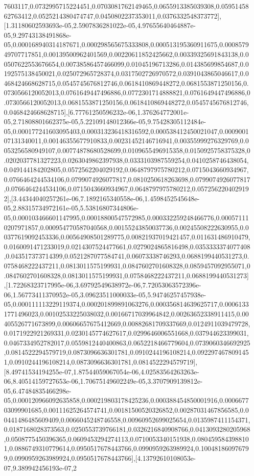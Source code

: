 \documentclass{article}
\begin{document}
7603117,0.0732995715224451,0.0703081762149465,0.0655913385039308,0.0595145862763412,0.0525214380474747,0.0450802237353011,0.0376332548373772],[1.31180602593693e-05,2.5907836281022e-05,4.97655640464887e-05,9.29743138491868e-05,0.000168940314187671,0.000298565675333808,0.000513195360911675,0.000857949707717851,0.00139500962401569,0.00220611852425662,0.00339325691843138,0.00507622553676654,0.00738586457466099,0.01045196713286,0.014385699854687,0.0192575138450021,0.025072965728374,0.0317502726970572,0.0391043865046617,0.0468424668628715,0.0545745676812746,0.0618410869448272,0.0681553871250156,0.0730566120052013,0.0761649447496886,0.0772301714888821,0.0761649447496886,0.0730566120052013,0.0681553871250156,0.0618410869448272,0.0545745676812746,0.0468424668628715],[6.77761250596232e-06,1.376264772001e-05,2.71808801662375e-05,5.22109148012366e-05,9.75428305112484e-05,0.000177241603095403,0.000313236418316592,0.000538412450021047,0.000900107131340011,0.00146355677910833,0.00231452146716941,0.00355999276329769,0.0053256580949107,0.00774878680528699,0.0109655496915358,0.0150925758375328,0.0202037781327223,0.0263049862397938,0.0333103987559254,0.0410258746438054,0.049144184202805,0.0572562204029192,0.0648797975780212,0.0715043660934967,0.0766464244534106,0.0799074926077817,0.0810250618263698,0.0799074926077817,0.0766464244534106,0.0715043660934967,0.0648797975780212,0.0572562204029192],[3.44344040257261e-06,7.1892165340558e-06,1.4598452545648e-05,2.88315734972161e-05,5.53816807344806e-05,0.000103466601147995,0.00018800547572985,0.000332259248466776,0.000571110207971857,0.000954770587040568,0.00155243850037736,0.00245508222630955,0.00377619092453336,0.00564908501289775,0.00821937019421457,0.011631486910479,0.0160091471233019,0.0214307524477661,0.0279024865816498,0.0353333374077408,0.043517373714399,0.0521287077584741,0.06073338746293,0.0688199440531273,0.0758468222437211,0.0813011575199931,0.0847602701608328,0.0859457092955071,0.0847602701608328,0.0813011575199931,0.0758468222437211,0.0688199440531273],[1.72268323717995e-06,3.69792549638972e-06,7.72053063572396e-06,1.56773411370952e-05,3.09623511000033e-05,5.94746257457938e-05,0.000111113229119374,0.000201899891063276,0.000356814639625717,0.00061331771496023,0.00102533225038032,0.00166717039964842,0.00263652338911415,0.00405526771673899,0.00606657675412669,0.00882681709337669,0.0124911039479728,0.0171922921269331,0.0230145774627617,0.0299646006551668,0.037944623399031,0.0467334952782017,0.0559812440400863,0.0652218466779604,0.0739060346692925,0.0814522294579719,0.0873096636301781,0.0910244196108214,0.0922974678091451,0.0910244196108214,0.0873096636301781,0.0814522294579719],[8.49741534194255e-07,1.87544059067054e-06,4.02583564263263e-06,8.40514159727653e-06,1.70675149602249e-05,3.3707909139812e-05,6.47484835466298e-05,0.000120966092635858,0.000219803178425236,0.000388454850001916,0.000667703099901685,0.00111625264574741,0.00181500520326852,0.00287031467856585,0.00441486485609409,0.0066045248746558,0.00960952699025654,0.0135987411154371,0.0187168028373563,0.0250553739766181,0.0326216840908766,0.0413093280205968,0.0508775450396365,0.0609453294274113,0.0710053340151938,0.0804595843988101,0.0886749310779614,0.0950517678443766,0.0990959263989924,0.100481860976799,0.0990959263989924,0.0950517678443766],[4.13792610108053e-07,9.389942456193e-07,2
\end{document}
